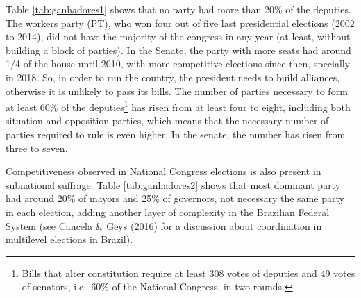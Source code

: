 \documentclass[
  12pt,
]{article}
\begin{document}
Table \ref{tab:ganhadores1} shows that no party had more than 20\% of
the deputies. The workers party (PT), who won four out of five last
presidential elections (2002 to 2014), did not have the majority of the
congress in any year (at least, without building a block of parties). In
the Senate, the party with more seats had around 1/4 of the house until
2010, with more competitive elections since then, specially in 2018. So,
in order to run the country, the president needs to build alliances,
otherwise it is unlikely to pass its bills. The number of parties
necessary to form at least 60\% of the deputies\footnote{Bills that
  alter constitution require at least 308 votes of deputies and 49 votes
  of senators, i.e.~60\% of the National Congress, in two rounds.} has
risen from at least four to eight, including both situation and
opposition parties, which means that the necessary number of parties
required to rule is even higher. In the senate, the number has risen
from three to seven.

Competitiveness observed in National Congress elections is also present
in subnational suffrage. Table \ref{tab:ganhadores2} shows that most
dominant party had around 20\% of mayors and 25\% of governors, not
necessary the same party in each election, adding another layer of
complexity in the Brazilian Federal System (see Cancela \& Geys (2016)
for a discussion about coordination in multilevel elections in Brazil).
\end{document}
